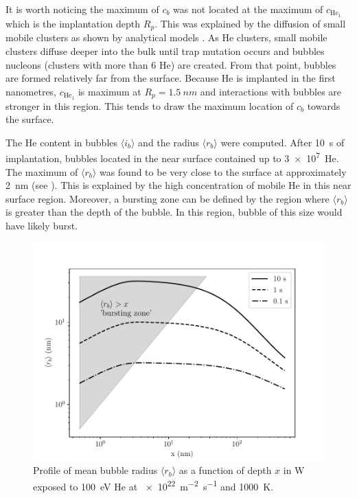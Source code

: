 It is worth noticing the maximum of $c_b$ was not located at the maximum of $c_{\mathrm{He}_1}$ which is the implantation depth $R_p$.
This was explained by the \gls{diffusion} of small mobile clusters as shown by analytical models .
As \gls{He} clusters, small mobile clusters diffuse deeper into the bulk until \gls{trap mutation} occurs and bubbles nucleons (clusters with more than 6 \gls{He}) are created.
From that point, bubbles are formed relatively far from the surface.
Because \gls{He} is implanted in the first nanometres, $c_{\mathrm{He}_1}$ is maximum at $R_p = \SI{1.5}{nm}$ and interactions with bubbles are stronger in this region.
This tends to draw the maximum location of $c_b$ towards the surface.

The \gls{He} content in bubbles $\langle i_b \rangle$ and the radius $\langle r_b \rangle$ were computed.
After \SI{10}{s} of implantation, bubbles located in the near surface contained up to \SI{3e7}{He}.
The maximum of $\langle r_b \rangle$ was found to be very close to the surface at approximately \SI{2}{nm} (see ).
This is explained by the high concentration of mobile \gls{He} in this near surface region.
Moreover, a bursting zone can be defined by the region where $\langle r_b \rangle$ is greater than the depth of the bubble.
In this region, bubble of this size would have likely burst.

\begin{figure} [h]
    \centering
    \includegraphics[width=\linewidth]{Figures/Chapter4/half_slab/profile_rb.pdf}
    \caption{Profile of mean bubble radius $\langle r_b \rangle$ as a function of depth $x$ in \gls{W} exposed to \SI{100}{eV} \gls{He} at \SI{e22}{m^{-2}.s^{-1}} and \SI{1000}{K}.}
\end{figure}

